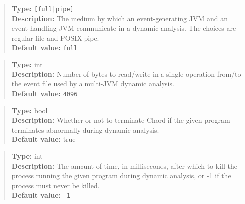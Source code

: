 \begin{quote}
{\bf Type:} {\tt [full|pipe]}  \\
{\bf Description:} The medium by which an event-generating JVM and an event-handling JVM communicate in a dynamic analysis.  The choices are regular file and POSIX pipe.  \\
{\bf Default value:} {\tt full} 
\end{quote}

\begin{quote}
{\bf Type:} int \\
{\bf Description:} Number of bytes to read/write in a single operation from/to the event file used by a multi-JVM dynamic analysis. \\
{\bf Default value:} {\tt 4096}
\end{quote}

\begin{quote}
{\bf Type:} bool \\
{\bf Description:} Whether or not to terminate Chord if the given program terminates abnormally during dynamic analysis. \\
{\bf Default value:} true
\end{quote}

\begin{quote}
{\bf Type:} int  \\
{\bf Description:} The amount of time, in milliseconds, after which to kill the process running the given program during dynamic analysis, or -1 if the process must never be killed. \\
{\bf Default value:} {\tt -1}
\end{quote}

